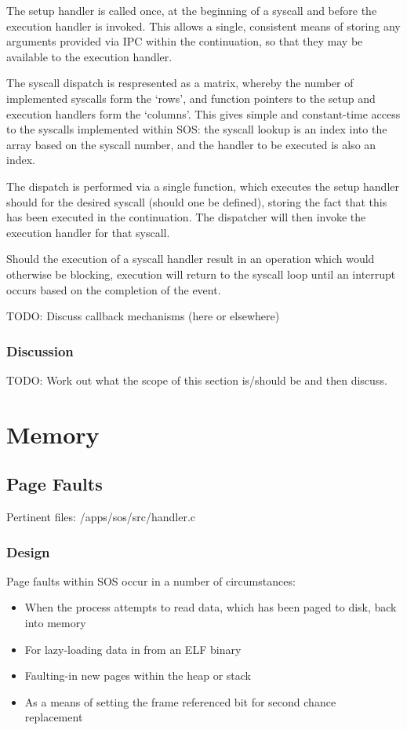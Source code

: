 \documentclass[a4paper,12pt]{article}
\begin{document}
The setup handler is called once, at the beginning of a syscall and before the
execution handler is invoked.  This allows a single, consistent means of
storing any arguments provided via IPC within the continuation, so that they
may be available to the execution handler.

The syscall dispatch is respresented as a matrix, whereby the number of
implemented syscalls form the `rows', and function pointers to the setup and
execution handlers form the `columns'.  This gives simple and constant-time
access to the syscalls implemented within SOS: the syscall lookup is an index
into the array based on the syscall number, and the handler to be executed is
also an index.

The dispatch is performed via a single function, which executes the setup
handler should for the desired syscall (should one be defined), storing the
fact that this has been executed in the continuation.  The dispatcher will
then invoke the execution handler for that syscall.

Should the execution of a syscall handler result in an operation which would
otherwise be blocking, execution will return to the syscall loop until an
interrupt occurs based on the completion of the event.

TODO: Discuss callback mechanisms (here or elsewhere)

\subsubsection{Discussion}
TODO: Work out what the scope of this section is/should be and then discuss.

\section{Memory}
\subsection{Page Faults}
Pertinent files: /apps/sos/src/handler.c

\subsubsection{Design}
Page faults within SOS occur in a number of circumstances:
\begin{itemize}
\item When the process attempts to read data, which has been paged to disk, back into memory
\item For lazy-loading data in from an ELF binary
\item Faulting-in new pages within the heap or stack
\item As a means of setting the frame referenced bit for second chance replacement\
\end{itemize}
\end{document}
